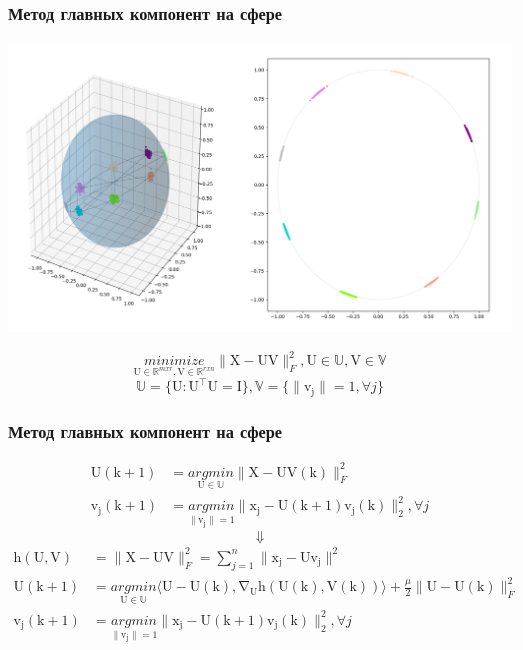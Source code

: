 \documentclass{beamer}
\begin{document}
\begin{frame}
\frametitle{Метод главных компонент на сфере}
\begin{centering}
\includegraphics[scale=0.17]{sphericalPCA.png}
\end{centering}

$$\underset{\mathrm{U} \in \mathbb{R}^{m x r}, \mathrm{V} \in \mathbb{R}^{r x n} }{minimize} \lVert \mathrm{X - UV} \rVert^2_F, \mathrm{U} \in \mathbb{U}, \mathrm{V} \in \mathbb{V}$$
$$\mathbb{U} = \{\mathrm{U : U^{\top}U=I }\}, \mathbb{V} = \{ \lVert \mathrm{v_j} \rVert = 1, \forall j \}$$
\end{frame}

\begin{frame}[t]
\frametitle{Метод главных компонент на сфере}
\begin{align*} 
\mathrm{U(k+1)} &= \underset{\mathrm{U} \in \mathbb{U} }{argmin}{\lVert \mathrm{X - UV(k)} \rVert^2_F} \\ 
\mathrm{v_j(k+1)} &= \underset{\lVert \mathrm{v_j} \rVert = 1}{argmin}{\lVert \mathrm{x_j - U(k+1)v_j(k)} \rVert^2_2, \forall j}
\end{align*}
$$\Downarrow$$
\begin{align*} 
\mathrm{h(U,V)} &= \lVert \mathrm{X - UV} \rVert^2_F = \sum_{j=1}^n \lVert \mathrm{x_j - Uv_j} \rVert^2 \\
\mathrm{U(k+1)} &= \underset{\mathrm{U} \in \mathbb{U} }{argmin}{ \langle \mathrm{U-U(k), \nabla_Uh(U(k),V(k))} \rangle + \frac{\mu}{2} \lVert \mathrm{U - U(k)} \rVert^2_F } \\ 
\mathrm{v_j(k+1)} &= \underset{\lVert \mathrm{v_j} \rVert = 1}{argmin}{\lVert \mathrm{x_j - U(k+1)v_j(k)} \rVert^2_2, \forall j}
\end{align*}


\end{frame}
\end{document}
